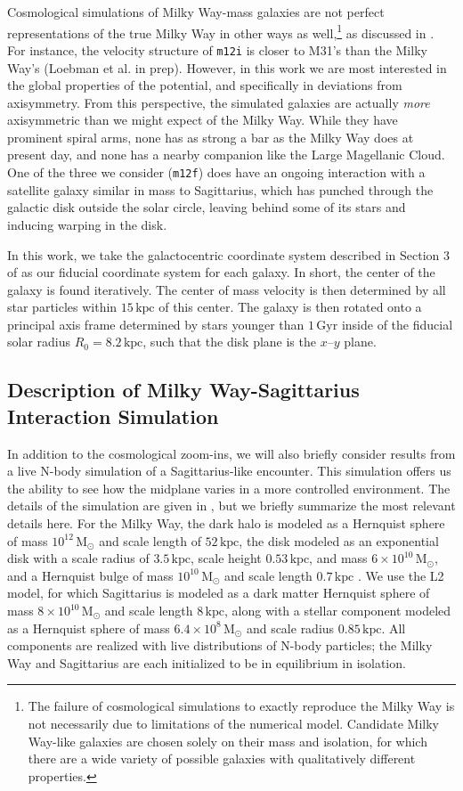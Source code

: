\documentclass[twocolumn]{aastex62}
\newcommand{\Msun}{\ensuremath{\text{M}_\odot}}
\newcommand{\kpc}{\text{kpc}}
\newcommand{\Gyr}{\text{Gyr}}
\newcommand{\mi}{\texttt{m12i}}
\newcommand{\mf}{\texttt{m12f}}
\begin{document}
Cosmological simulations of Milky Way-mass galaxies are not perfect
representations of the true Milky Way in other ways as well,\footnote{The
failure of cosmological simulations to exactly reproduce the Milky Way is not necessarily due to limitations of the numerical model. Candidate Milky Way-like
galaxies are chosen solely on their mass and isolation, for which there are a
wide variety of possible galaxies with qualitatively different properties.} as
discussed in \citet{2018arXiv180610564S}. For instance, the velocity structure
of \mi{} is closer to M31's than the Milky Way's (Loebman et al. in prep).
However, in this work we are most interested in the global properties of the
potential, and specifically in deviations from axisymmetry. From this
perspective, the simulated galaxies are actually \emph{more} axisymmetric than
we might expect of the Milky Way. While they have prominent spiral arms, none
has as strong a bar as the Milky Way does at present day, and none has a
nearby companion like the Large Magellanic Cloud. One of the three we consider
(\mf) does have an ongoing interaction with a satellite galaxy similar in mass to
Sagittarius, which has punched through the galactic disk outside the solar
circle, leaving behind some of its stars and inducing warping in the disk.

In this work, we take the galactocentric coordinate system described in
Section 3 of \citet{2018arXiv180610564S} as our fiducial coordinate system for
each galaxy. In short, the center of the galaxy is found iteratively. The
center of mass velocity is then determined by all star particles within
$15\,\kpc$ of this center. The galaxy is then rotated onto a principal axis
frame determined by stars younger than $1\,\Gyr$ inside of the fiducial solar
radius $R_{0} = 8.2\,\kpc$, such that the disk plane is the $x$--$y$ plane.

\subsection{Description of Milky Way-Sagittarius Interaction Simulation} 
\label{ssec:sag_sim}
In addition to the cosmological zoom-ins, we will also briefly consider
results from a live N-body simulation of a Sagittarius-like encounter. This
simulation offers us the ability to see how the midplane varies in a more
controlled environment. The details of the simulation are given in
\citet{2018MNRAS.481..286L}, but we briefly summarize the most relevant
details here. For the Milky Way, the dark halo is modeled as a Hernquist
sphere of mass $10^{12}\,\Msun$ and scale length of $52\,\kpc$, the disk
modeled as an exponential disk with a scale radius of $3.5\,\kpc$, scale
height $0.53\,\kpc$, and mass $6\times10^{10}\,\Msun$, and a Hernquist bulge
of mass $10^{10}\,\Msun$ and scale length $0.7\,\kpc$
\citep{1990ApJ...356..359H}. We use the L2 model, for which Sagittarius is
modeled as a dark matter Hernquist sphere of mass $8\times10^{10}\,\Msun$ and
scale length $8\,\kpc$, along with a stellar component modeled as a Hernquist
sphere of mass $6.4\times10^8\,\Msun$ and scale radius $0.85\,\kpc$. All
components are realized with live distributions of N-body particles; the Milky
Way and Sagittarius are each initialized to be in equilibrium in isolation.
\end{document}

